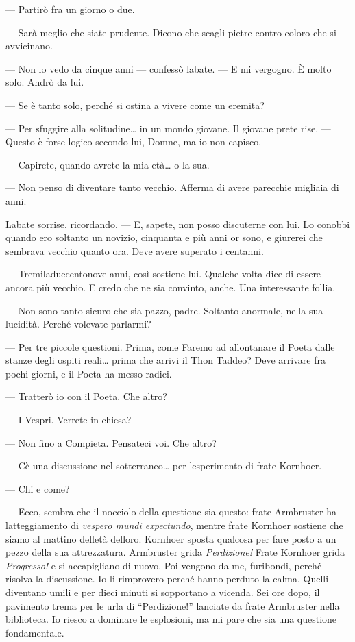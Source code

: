 --- Partirò fra un giorno o due.

--- Sarà meglio che siate prudente. Dicono che scagli pietre contro
coloro che si avvicinano.

--- Non lo vedo da cinque anni --- confessò l\textquotesingle abate. ---
E mi vergogno. È molto solo. Andrò da lui.

--- Se è tanto solo, perché si ostina a vivere come un eremita?

--- Per sfuggire alla solitudine\ldots{} in un mondo giovane. Il giovane
prete rise. --- Questo è forse logico secondo lui, Domne, ma io non
capisco.

--- Capirete, quando avrete la mia età\ldots{} o la sua.

--- Non penso di diventare tanto vecchio. Afferma di avere parecchie
migliaia di anni.

L\textquotesingle abate sorrise, ricordando. --- E, sapete, non posso
discuterne con lui. Lo conobbi quando ero soltanto un novizio, cinquanta
e più anni or sono, e giurerei che sembrava vecchio quanto ora. Deve
avere superato i cent\textquotesingle anni.

--- Tremiladuecentonove anni, così sostiene lui. Qualche volta dice di
essere ancora più vecchio. E credo che ne sia convinto, anche. Una
interessante follia.

--- Non sono tanto sicuro che sia pazzo, padre. Soltanto anormale, nella
sua lucidità. Perché volevate parlarmi?

--- Per tre piccole questioni. Prima, come Faremo ad allontanare il
Poeta dalle stanze degli ospiti reali\ldots{} prima che arrivi il Thon
Taddeo? Deve arrivare fra pochi giorni, e il Poeta ha messo radici.

--- Tratterò io con il Poeta. Che altro?

--- I Vespri. Verrete in chiesa?

--- Non fino a Compieta. Pensateci voi. Che altro?

--- C\textquotesingle è una discussione nel sotterraneo\ldots{} per
l\textquotesingle esperimento di frate Kornhoer.

--- Chi e come?

--- Ecco, sembra che il nocciolo della questione sia questo: frate
Armbruster ha l\textquotesingle atteggiamento di \emph{vespero mundi
	expectundo}, mentre frate Kornhoer sostiene che siamo al mattino
dell\textquotesingle età dell\textquotesingle oro. Kornhoer sposta
qualcosa per fare posto a un pezzo della sua attrezzatura. Armbruster
grida \emph{Perdizione!} Frate Kornhoer grida \emph{Progresso!} e si
accapigliano di nuovo. Poi vengono da me, furibondi, perché risolva la
discussione. Io li rimprovero perché hanno perduto la calma. Quelli
diventano umili e per dieci minuti si sopportano a vicenda. Sei ore
dopo, il pavimento trema per le urla di ``Perdizione!'' lanciate da
frate Armbruster nella biblioteca. Io riesco a dominare le esplosioni,
ma mi pare che sia una questione fondamentale.

